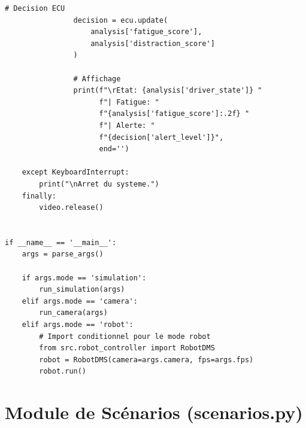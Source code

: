 \documentclass[12pt,a4paper,twoside]{report}
\begin{document}
\begin{lstlisting}[style=pythonstyle, caption={Point d'entrée principal du système DMS.}, label={lst:main}]
                # Decision ECU
                decision = ecu.update(
                    analysis['fatigue_score'],
                    analysis['distraction_score']
                )
                
                # Affichage
                print(f"\rEtat: {analysis['driver_state']} "
                      f"| Fatigue: "
                      f"{analysis['fatigue_score']:.2f} "
                      f"| Alerte: "
                      f"{decision['alert_level']}", 
                      end='')
    
    except KeyboardInterrupt:
        print("\nArret du systeme.")
    finally:
        video.release()


if __name__ == '__main__':
    args = parse_args()
    
    if args.mode == 'simulation':
        run_simulation(args)
    elif args.mode == 'camera':
        run_camera(args)
    elif args.mode == 'robot':
        # Import conditionnel pour le mode robot
        from src.robot_controller import RobotDMS
        robot = RobotDMS(camera=args.camera, fps=args.fps)
        robot.run()
\end{lstlisting}

\section{Module de Scénarios (scenarios.py)}
\end{document}
